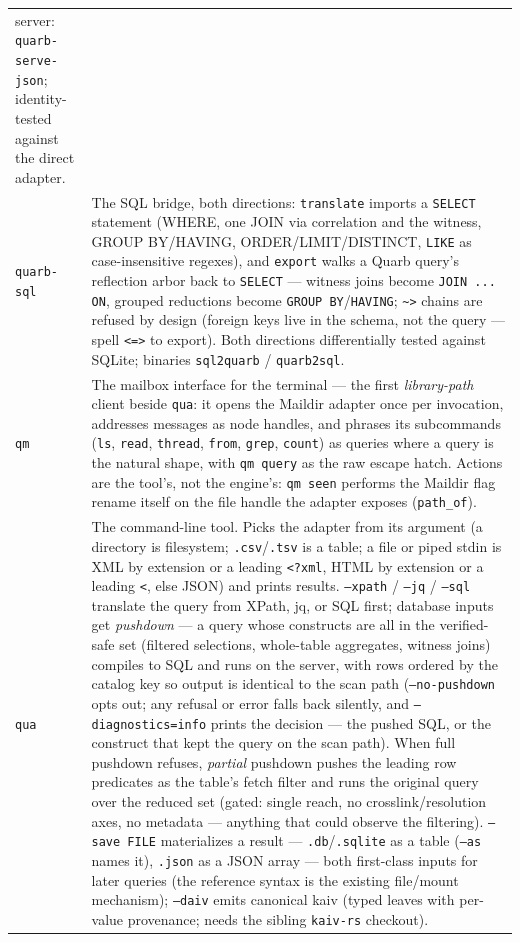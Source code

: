 \documentclass{report}
\begin{document}
\begin{xltabular}{\textwidth}{l X}
  server: \texttt{quarb-serve-json}; identity-tested against the
  direct adapter. \\
\texttt{quarb-sql} & The SQL bridge, both directions:
  \texttt{translate} imports a \texttt{SELECT} statement (WHERE,
  one JOIN via correlation and the witness, GROUP BY/HAVING,
  ORDER/LIMIT/DISTINCT, \texttt{LIKE} as case-insensitive
  regexes), and \texttt{export} walks a Quarb query's reflection
  arbor back to \texttt{SELECT} — witness joins become
  \texttt{JOIN ... ON}, grouped reductions become \texttt{GROUP
  BY}/\texttt{HAVING}; \texttt{\textasciitilde>} chains are
  refused by design (foreign keys live in the schema, not the
  query — spell \texttt{<=>} to export). Both directions
  differentially tested against SQLite; binaries
  \texttt{sql2quarb} / \texttt{quarb2sql}. \\
\texttt{qm} & The mailbox interface for the terminal — the
  first \emph{library-path} client beside \texttt{qua}: it opens
  the Maildir adapter once per invocation, addresses messages as
  node handles, and phrases its subcommands (\texttt{ls},
  \texttt{read}, \texttt{thread}, \texttt{from}, \texttt{grep},
  \texttt{count}) as queries where a query is the natural shape,
  with \texttt{qm query} as the raw escape hatch. Actions are the
  tool's, not the engine's: \texttt{qm seen} performs the Maildir
  flag rename itself on the file handle the adapter exposes
  (\texttt{path\_of}). \\
\texttt{qua} & The command-line tool. Picks the adapter from its
  argument (a directory is filesystem; \texttt{.csv}/\texttt{.tsv}
  is a table; a file or piped stdin is XML by extension or a leading
  \texttt{<?xml}, HTML by extension or a leading \texttt{<}, else
  JSON) and prints results. \texttt{--xpath} / \texttt{--jq} / \texttt{--sql}
  translate the query from XPath, jq, or SQL first; database
  inputs get \emph{pushdown} — a query whose constructs are all
  in the verified-safe set (filtered selections, whole-table
  aggregates, witness joins) compiles to SQL and runs on the
  server, with rows ordered by the catalog key so output is
  identical to the scan path (\texttt{--no-pushdown} opts out;
  any refusal or error falls back silently, and
  \texttt{--diagnostics=info} prints the decision — the pushed SQL, or the
  construct that kept the query on the scan path). When full
  pushdown refuses, \emph{partial} pushdown pushes the leading
  row predicates as the table's fetch filter and runs the original
  query over the reduced set (gated: single reach, no
  crosslink/resolution axes, no metadata — anything that could
  observe the filtering). \texttt{--save FILE} materializes a
  result — \texttt{.db}/\texttt{.sqlite} as a table
  (\texttt{--as} names it), \texttt{.json} as a JSON array —
  both first-class inputs for later queries (the reference syntax
  is the existing file/mount mechanism); \texttt{--daiv} emits
  canonical kaiv (typed leaves with per-value provenance; needs the
  sibling \texttt{kaiv-rs} checkout). \\
\bottomrule
\end{xltabular}
\end{document}
